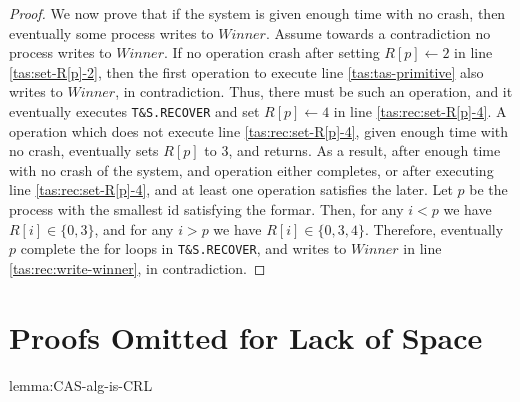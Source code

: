\begin{proof}
	We now prove that if the system is given enough time with no crash, then eventually some process writes to $Winner$. Assume towards a contradiction no process writes to $Winner$. If no operation crash after setting $R[p] \gets 2$ in line \ref{tas:set-R[p]-2}, then the first operation to execute line \ref{tas:tas-primitive} also writes to $Winner$, in contradiction. Thus, there must be such an operation, and it eventually executes \texttt{T\&S.RECOVER} and set $R[p] \gets 4$ in line \ref{tas:rec:set-R[p]-4}. A operation which does not execute line \ref{tas:rec:set-R[p]-4}, given enough time with no crash, eventually sets $R[p]$ to 3, and returns. As a result, after enough time with no crash of the system, and operation either completes, or after executing line \ref{tas:rec:set-R[p]-4}, and at least one operation satisfies the later. Let $p$ be the process with the smallest id satisfying the formar. Then, for any $i < p$ we have $R[i] \in \{0,3\}$, and for any $i > p$ we have $R[i] \in \{0,3,4\}$. Therefore, eventually $p$ complete the for loops in \texttt{T\&S.RECOVER}, and writes to $Winner$ in line \ref{tas:rec:write-winner}, in contradiction.
	
\end{proof}

\section{Proofs Omitted for Lack of Space}
\begin{lemma-repeat}{lemma:CAS-alg-is-CRL}
\end{lemma-repeat}

